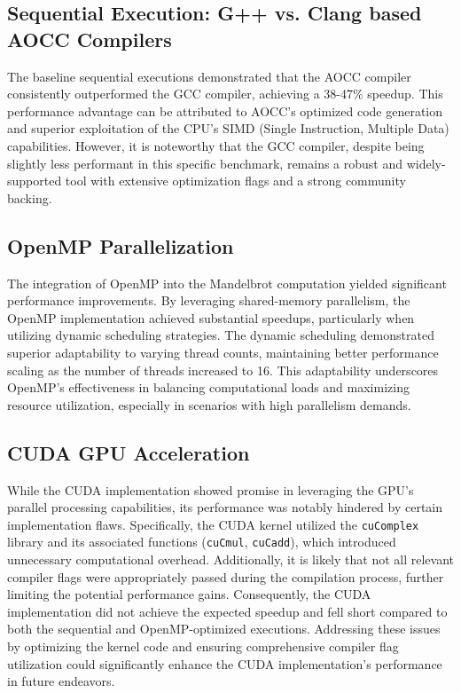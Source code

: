 \documentclass[
	report, %
	11pt, %
]{CSUniSchoolLabReport}
\newcounter{ct}
\begin{document}
\subsection{Sequential Execution: G++ vs. Clang based AOCC Compilers}

The baseline sequential executions demonstrated that the AOCC compiler consistently outperformed the GCC compiler, achieving a 38-47\% speedup. This performance advantage can be attributed to AOCC's optimized code generation and superior exploitation of the CPU's SIMD (Single Instruction, Multiple Data) capabilities. However, it is noteworthy that the GCC compiler, despite being slightly less performant in this specific benchmark, remains a robust and widely-supported tool with extensive optimization flags and a strong community backing.

\subsection{OpenMP Parallelization}

The integration of OpenMP into the Mandelbrot computation yielded significant performance improvements. By leveraging shared-memory parallelism, the OpenMP implementation achieved substantial speedups, particularly when utilizing dynamic scheduling strategies. The dynamic scheduling demonstrated superior adaptability to varying thread counts, maintaining better performance scaling as the number of threads increased to 16. This adaptability underscores OpenMP's effectiveness in balancing computational loads and maximizing resource utilization, especially in scenarios with high parallelism demands.

\subsection{CUDA GPU Acceleration}

While the CUDA implementation showed promise in leveraging the GPU's parallel processing capabilities, its performance was notably hindered by certain implementation flaws. Specifically, the CUDA kernel utilized the \texttt{cuComplex} library and its associated functions (\texttt{cuCmul}, \texttt{cuCadd}), which introduced unnecessary computational overhead. Additionally, it is likely that not all relevant compiler flags were appropriately passed during the compilation process, further limiting the potential performance gains. Consequently, the CUDA implementation did not achieve the expected speedup and fell short compared to both the sequential and OpenMP-optimized executions. Addressing these issues by optimizing the kernel code and ensuring comprehensive compiler flag utilization could significantly enhance the CUDA implementation's performance in future endeavors.
\end{document}
